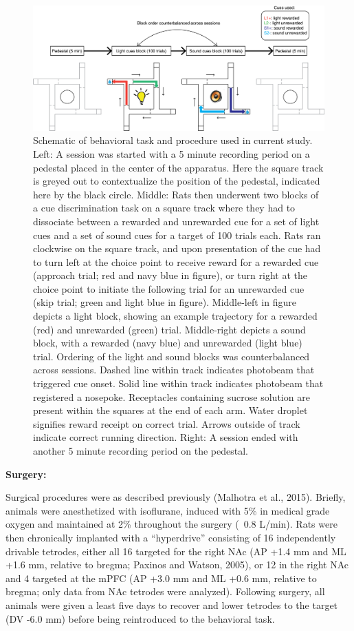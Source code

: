 \documentclass[11pt]{article}
\begin{document}
\begin{figure}[h]
\centering
\includegraphics[width=\textwidth]{Fig 2 - Schematic task.png}
\caption{Schematic of behavioral task and procedure used in current study. Left: A session was started with a 5 minute recording period on a pedestal placed in the center of the apparatus. Here the square track is greyed out to contextualize the position of the pedestal, indicated here by the black circle. Middle: Rats then underwent two blocks of a cue discrimination task on a square track where they had to dissociate between a rewarded and unrewarded cue for a set of light cues and a set of sound cues for a target of 100 trials each. Rats ran clockwise on the square track, and upon presentation of the cue had to turn left at the choice point to receive reward for a rewarded cue (approach trial; red and navy blue in figure), or turn right at the choice point to initiate the following trial for an unrewarded cue (skip trial; green and light blue in figure). Middle-left in figure depicts a light block, showing an example trajectory for a rewarded (red) and unrewarded (green) trial. Middle-right depicts a sound block, with a rewarded (navy blue) and unrewarded (light blue) trial. Ordering of the light and sound blocks was counterbalanced across sessions. Dashed line within track indicates photobeam that triggered cue onset. Solid line within track indicates photobeam that registered a nosepoke. Receptacles containing sucrose solution are present within the squares at the end of each arm. Water droplet signifies reward receipt on correct trial. Arrows outside of track indicate correct running direction. Right: A session ended with another 5 minute recording period on the pedestal.}
\label{fig:task}
\end{figure}

{\bf Surgery:}

Surgical procedures were as described previously (Malhotra et al., 2015). Briefly, animals were anesthetized with isoflurane, induced with 5\% in medical grade oxygen and maintained at 2\% throughout the surgery (~0.8 L/min). Rats were then chronically implanted with a “hyperdrive” consisting of 16 independently drivable tetrodes, either all 16 targeted for the right NAc (AP +1.4 mm and ML +1.6 mm, relative to bregma; Paxinos and Watson, 2005), or 12 in the right NAc and 4 targeted at the mPFC (AP +3.0 mm and ML +0.6 mm, relative to bregma; only data from NAc tetrodes were analyzed). Following surgery, all animals were given a least five days to recover and lower tetrodes to the target (DV -6.0 mm) before being reintroduced to the behavioral task.
\end{document}
